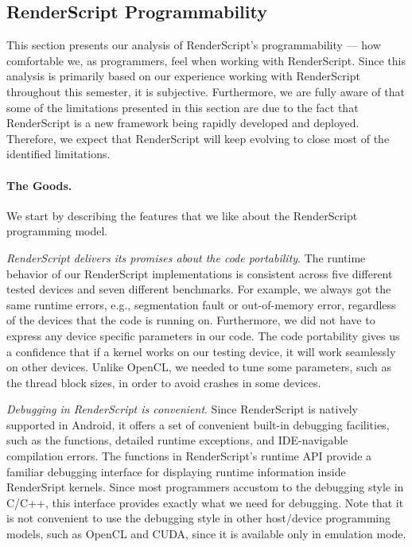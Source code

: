 \subsection{RenderScript Programmability}
This section presents our analysis of RenderScript's programmability --- how
comfortable we, as programmers, feel when working with RenderScript. Since this
analysis is primarily based on our experience working with RenderScript
throughout this semester, it is subjective. Furthermore, we are fully aware of
that some of the limitations presented in this section are due to the fact that
RenderScript is a new framework being rapidly developed and deployed.
Therefore, we expect that RenderScript will keep evolving to close most of the
identified limitations.

\paragraph{The Goods.}
We start by describing the features that we like about the RenderScript
programming model.

\textit{RenderScript delivers its promises about the code portability}.
The runtime behavior of our RenderScript implementations is consistent across
five different tested devices and seven different benchmarks. For example, we
always got the same runtime errors, e.g., segmentation fault or out-of-memory
error, regardless of the devices that the code is running on. Furthermore, we
did not have to express any device specific parameters in our code. The code
portability gives us a confidence that if a kernel works on our testing device,
it will work seamlessly on other devices. Unlike OpenCL, we needed to tune some
parameters, such as the thread block sizes, in order to avoid crashes in some
devices.

\textit{Debugging in RenderScript is convenient}. Since RenderScript is natively
supported in Android, it offers a set of convenient built-in debugging
facilities, such as the  functions, detailed runtime exceptions,
and IDE-navigable compilation errors. The  functions in
RenderScript's runtime API provide a familiar debugging interface for displaying
runtime information inside RenderSript kernels. Since most programmers accustom
to the  debugging style in C/C++, this interface provides exactly
what we need for debugging. Note that it is not convenient to use the
 debugging style in other host/device programming models, such as
OpenCL and CUDA, since it is available only in emulation mode.

